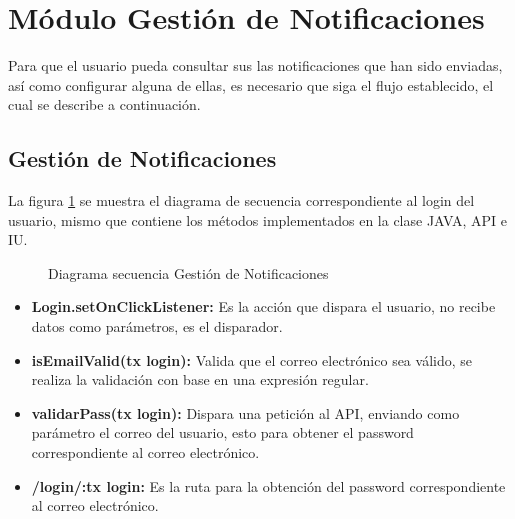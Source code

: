 
\section{Módulo Gestión de Notificaciones}
Para que el usuario pueda consultar sus las notificaciones que han sido enviadas, así como configurar alguna de ellas, es necesario que siga el flujo establecido, el cual se describe a continuación.\\


\subsection{Gestión de Notificaciones}

La figura \ref{fig:GestionNotifica} se muestra el diagrama de secuencia correspondiente al login del usuario, mismo que contiene los métodos implementados en la clase JAVA, API e IU.

\begin{figure}[htbp!]
	\centering
	\caption{Diagrama secuencia Gestión de Notificaciones}
	\label{fig:GestionNotifica}
\end{figure}
\begin{itemize}
	\item \textbf{Login.setOnClickListener:} Es la acción que dispara el usuario, no recibe datos como parámetros, es el disparador.
	\item \textbf{isEmailValid(tx login):} Valida que el correo electrónico sea válido, se realiza la validación con base en una expresión regular.
	\item \textbf{validarPass(tx login):} Dispara una petición al API, enviando como parámetro el correo del usuario, esto para obtener el password correspondiente al correo electrónico.
	\item \textbf{/login/:tx login:} Es la ruta para la obtención del password correspondiente al correo electrónico.
\end{itemize}

